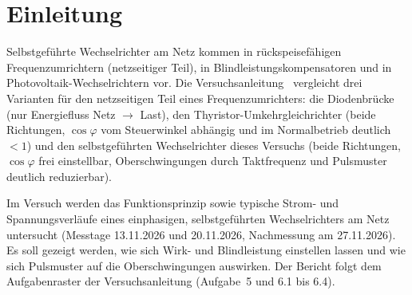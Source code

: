 \section{Einleitung}

Selbstgeführte Wechselrichter am Netz kommen in rückspeisefähigen Frequenzumrichtern (netzseitiger Teil), in Blindleistungskompensatoren und in Photovoltaik-Wechselrichtern vor. Die Versuchsanleitung~\cite{anleitung} vergleicht drei Varianten für den netzseitigen Teil eines Frequenzumrichters: die Diodenbrücke (nur Energiefluss Netz $\to$ Last), den Thyristor-Umkehrgleichrichter (beide Richtungen, $\cos\varphi$ vom Steuerwinkel abhängig und im Normalbetrieb deutlich $<1$) und den selbstgeführten Wechselrichter dieses Versuchs (beide Richtungen, $\cos\varphi$ frei einstellbar, Oberschwingungen durch Taktfrequenz und Pulsmuster deutlich reduzierbar).

Im Versuch werden das Funktionsprinzip sowie typische Strom- und Spannungsverläufe eines einphasigen, selbstgeführten Wechselrichters am Netz untersucht (Messtage 13.11.2026 und 20.11.2026, Nachmessung am 27.11.2026). Es soll gezeigt werden, wie sich Wirk- und Blindleistung einstellen lassen und wie sich Pulsmuster auf die Oberschwingungen auswirken. Der Bericht folgt dem Aufgabenraster der Versuchsanleitung (Aufgabe~5 und 6.1 bis 6.4).
